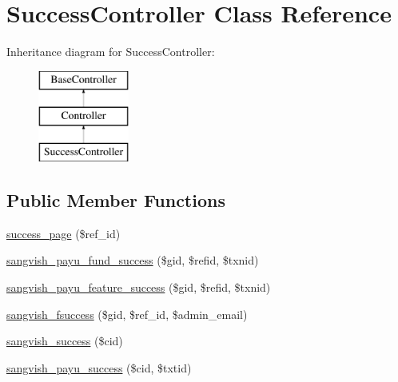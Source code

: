 \hypertarget{class_responsive_1_1_http_1_1_controllers_1_1_success_controller}{}\section{Success\+Controller Class Reference}
\label{class_responsive_1_1_http_1_1_controllers_1_1_success_controller}
Inheritance diagram for Success\+Controller\+:\begin{figure}[H]
\begin{center}
\leavevmode
\includegraphics[height=3.000000cm]{class_responsive_1_1_http_1_1_controllers_1_1_success_controller}
\end{center}
\end{figure}
\subsection*{Public Member Functions}
\begin{DoxyCompactItemize}
\item 
\mbox{\hyperlink{class_responsive_1_1_http_1_1_controllers_1_1_success_controller_aff08e6d23e1e359171985625ca1d6b47}{success\+\_\+page}} (\$ref\+\_\+id)
\item 
\mbox{\hyperlink{class_responsive_1_1_http_1_1_controllers_1_1_success_controller_a103c4b4f02271ad727fcefe68525ed72}{sangvish\+\_\+payu\+\_\+fund\+\_\+success}} (\$gid, \$refid, \$txnid)
\item 
\mbox{\hyperlink{class_responsive_1_1_http_1_1_controllers_1_1_success_controller_a58b7405d84a9ab321d38338e2a424977}{sangvish\+\_\+payu\+\_\+feature\+\_\+success}} (\$gid, \$refid, \$txnid)
\item 
\mbox{\hyperlink{class_responsive_1_1_http_1_1_controllers_1_1_success_controller_ae3ec1a40ba04486b8b8ef25720c97e68}{sangvish\+\_\+fsuccess}} (\$gid, \$ref\+\_\+id, \$admin\+\_\+email)
\item 
\mbox{\hyperlink{class_responsive_1_1_http_1_1_controllers_1_1_success_controller_abd6089d6c180be9979322c6ea5958433}{sangvish\+\_\+success}} (\$cid)
\item 
\mbox{\hyperlink{class_responsive_1_1_http_1_1_controllers_1_1_success_controller_a02ab45cf04c49454607b5292c296f58c}{sangvish\+\_\+payu\+\_\+success}} (\$cid, \$txtid)
\end{DoxyCompactItemize}


